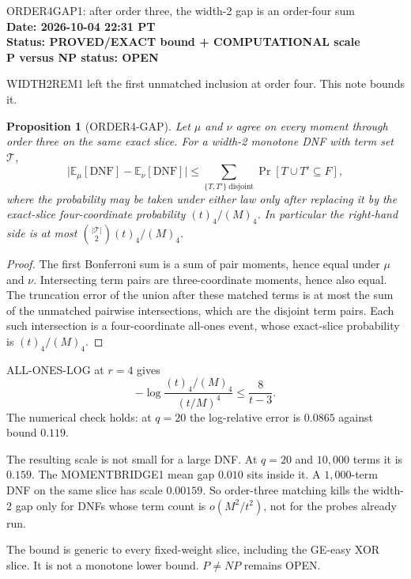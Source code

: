\documentclass[11pt]{article}
\newtheorem{proposition}{Proposition}
\begin{document}
\begin{center}
{\Large ORDER4GAP1: after order three, the width-2 gap is an order-four sum}\\[4pt]
\textbf{Date: 2026-10-04 22:31 PT}\\
\textbf{Status: PROVED/EXACT bound + COMPUTATIONAL scale}\\
\textbf{P versus NP status: OPEN}
\end{center}

WIDTH2REM1 left the first unmatched inclusion at order four. This note bounds it.

\begin{proposition}[ORDER4-GAP]
Let $\mu$ and $\nu$ agree on every moment through order three on the same exact slice. For a width-2 monotone DNF with term set $\mathcal T$,
\[
\bigl|\mathbb E_\mu[\mathrm{DNF}]-\mathbb E_\nu[\mathrm{DNF}]\bigr|
\le
\sum_{\{T,T'\}\ \mathrm{disjoint}}
\Pr[T\cup T'\subseteq F],
\]
where the probability may be taken under either law only after replacing it by the exact-slice four-coordinate probability $(t)_4/(M)_4$. In particular the right-hand side is at most $\binom{|\mathcal T|}{2}(t)_4/(M)_4$.
\end{proposition}
\begin{proof}
The first Bonferroni sum is a sum of pair moments, hence equal under $\mu$ and $\nu$. Intersecting term pairs are three-coordinate moments, hence also equal. The truncation error of the union after these matched terms is at most the sum of the unmatched pairwise intersections, which are the disjoint term pairs. Each such intersection is a four-coordinate all-ones event, whose exact-slice probability is $(t)_4/(M)_4$.
\end{proof}

ALL-ONES-LOG at $r=4$ gives
\[
-\log\frac{(t)_4/(M)_4}{(t/M)^4}\le \frac{8}{t-3}.
\]
The numerical check holds: at $q=20$ the log-relative error is $0.0865$ against bound $0.119$.

The resulting scale is not small for a large DNF. At $q=20$ and $10{,}000$ terms it is $0.159$. The MOMENTBRIDGE1 mean gap $0.010$ sits inside it. A $1{,}000$-term DNF on the same slice has scale $0.00159$. So order-three matching kills the width-2 gap only for DNFs whose term count is $o(M^2/t^2)$, not for the probes already run.

The bound is generic to every fixed-weight slice, including the GE-easy XOR slice. It is not a monotone lower bound. $P\ne NP$ remains OPEN.
\end{document}
